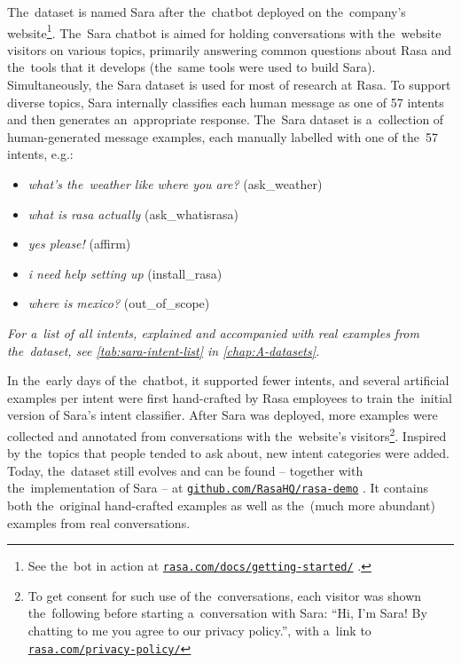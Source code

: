 \documentclass[bsc,frontabs,singlespacing,parskip,deptreport]{infthesis}
\newcommand\rurl[1]{%
  \href{https://#1}{\nolinkurl{#1}}%
}
\begin{document}
{{{      The~dataset is named Sara after the~chatbot deployed on the~company's website\footnote{See the~bot in action at \rurl{rasa.com/docs/getting-started/}.}.
      The~Sara chatbot is aimed for holding conversations with the~website visitors on various topics, primarily answering common questions about Rasa and the~tools that it develops (the~same tools were used to build Sara). Simultaneously, the Sara dataset is used for most of research at Rasa.
      To support diverse topics, Sara internally classifies each human message as one of 57 intents and then generates an~appropriate response. The~Sara dataset is a~collection of human-generated message examples, each manually labelled with one of the~57 intents, e.g.:
      \begin{itemize}
        \item \textit{what's the~weather like where you are?} (ask\_weather)
        \item \textit{what is rasa actually} (ask\_whatisrasa)
        \item \textit{yes please!} (affirm)
        \item \textit{i need help setting up} (install\_rasa)
        \item \textit{where is mexico?} (out\_of\_scope)
      \end{itemize}
      \textit{For a~list of all intents, explained and accompanied with real examples from the~dataset, see \autoref{tab:sara-intent-list} in \autoref{chap:A-datasets}.}

      In the~early days of the~chatbot, it supported fewer intents, and several artificial examples per intent were first hand-crafted by Rasa employees to train the~initial version of Sara's intent classifier. After Sara was deployed, more examples were collected and annotated from conversations with the~website's visitors\footnote{To get consent for such use of the~conversations, each visitor was shown the~following before starting a~conversation with Sara: ``Hi, I'm Sara! By chatting to me you agree to our privacy policy.'', with a~link to \rurl{rasa.com/privacy-policy/}}. Inspired by the~topics that people tended to ask about, new intent categories were added. Today, the~dataset still evolves and can be found -- together with the~implementation of Sara -- at \rurl{github.com/RasaHQ/rasa-demo}. It contains both the~original hand-crafted examples as well as the~(much more abundant) examples from real conversations.

}}}
\end{document}
